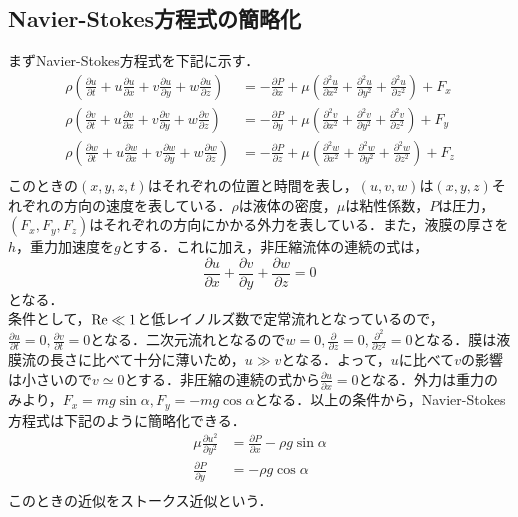 \documentclass[autodetect-engine,dvipdfmx-if-dvi,ja=standard,a4paper,11pt]{bxjsarticle} %
\begin{document}
\subsection{Navier-Stokes方程式の簡略化}
まずNavier-Stokes方程式を下記に示す．
\begin{equation}
\begin{split}
\rho \left(\frac{\partial u}{\partial t}+u\frac{\partial u}{\partial x}+v\frac{\partial u}{\partial y}+w\frac{\partial u}{\partial z}\right)&=-\frac{\partial P}{\partial x}+\mu \left(\frac{\partial ^2u}{\partial x^2}+\frac{\partial^2 u}{\partial y^2}+\frac{\partial^2 u}{\partial z^2}\right)+F_x\\
\rho \left(\frac{\partial v}{\partial t}+u\frac{\partial v}{\partial x}+v\frac{\partial v}{\partial y}+w\frac{\partial v}{\partial z}\right)&=-\frac{\partial P}{\partial y}+\mu \left(\frac{\partial ^2v}{\partial x^2}+\frac{\partial ^2v}{\partial y^2}+\frac{\partial ^2v}{\partial z^2}\right)+F_y\\
\rho \left(\frac{\partial w}{\partial t}+u\frac{\partial w}{\partial x}+v\frac{\partial w}{\partial y}+w\frac{\partial w}{\partial z}\right)&=-\frac{\partial P}{\partial z}+\mu \left(\frac{\partial ^2w}{\partial x^2}+\frac{\partial ^2w}{\partial y^2}+\frac{\partial ^2w}{\partial z^2}\right)+F_z\\
\end{split}
\end{equation}
このときの$(x,y,z,t)$はそれぞれの位置と時間を表し，$(u,v,w)$は$(x,y,z)$それぞれの方向の速度を表している．$\rho$は液体の密度，$\mu$は粘性係数，$P$は圧力，$(F_x,F_y,F_z)$はそれぞれの方向にかかる外力を表している．また，液膜の厚さを$h$，重力加速度を$g$とする．これに加え，非圧縮流体の連続の式は，
\begin{equation}
\frac{\partial u}{\partial x}+\frac{\partial v}{\partial y}+\frac{\partial w}{\partial z}=0
\label{eq:mass}
\end{equation}
となる．\\
\　条件として，${\rm Re}\ll1$と低レイノルズ数で定常流れとなっているので，$\frac{\partial u}{\partial t}=0,\frac{\partial v}{\partial t}=0$となる．二次元流れとなるので$w=0,\frac{\partial }{\partial z}=0,\frac{\partial ^2}{\partial z^2}=0$となる．膜は液膜流の長さに比べて十分に薄いため，$u\gg v$となる．よって，$u$に比べて$v$の影響は小さいので$v\simeq 0$とする．非圧縮の連続の式から$\frac{\partial u}{\partial x}=0$となる．外力は重力のみより，$F_x=mg\sin\alpha,F_y=-mg\cos\alpha$となる．以上の条件から，Navier-Stokes方程式は下記のように簡略化できる．
\begin{equation}
\begin{split}
\mu\frac{\partial u^2}{\partial y^2}&=\frac{\partial P}{\partial x}-\rho g\sin\alpha\\
\frac{\partial P}{\partial y}&=-\rho g\cos\alpha\\
\end{split}
\label{eq:simple}
\end{equation}
このときの近似をストークス近似という．
\end{document}
